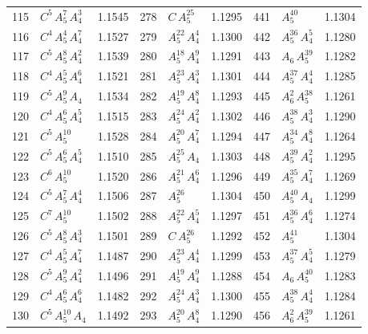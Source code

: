 \begin{longtable}{@{}rlr@{\quad}rlr@{\quad}rlr@{}}
115 & $C^{5}$\,$A_{5}^{7}$\,$A_{4}^{3}$ & 1.1545 & 278 & $C$\,$A_{5}^{25}$ & 1.1295 & 441 & $A_{5}^{40}$ & 1.1304 \\
116 & $C^{4}$\,$A_{5}^{4}$\,$A_{4}^{7}$ & 1.1527 & 279 & $A_{5}^{22}$\,$A_{4}^{4}$ & 1.1300 & 442 & $A_{5}^{36}$\,$A_{4}^{5}$ & 1.1280 \\
117 & $C^{5}$\,$A_{5}^{8}$\,$A_{4}^{2}$ & 1.1539 & 280 & $A_{5}^{18}$\,$A_{4}^{9}$ & 1.1291 & 443 & $A_{6}$\,$A_{5}^{39}$ & 1.1282 \\
118 & $C^{4}$\,$A_{5}^{5}$\,$A_{4}^{6}$ & 1.1521 & 281 & $A_{5}^{23}$\,$A_{4}^{3}$ & 1.1301 & 444 & $A_{5}^{37}$\,$A_{4}^{4}$ & 1.1285 \\
119 & $C^{5}$\,$A_{5}^{9}$\,$A_{4}$ & 1.1534 & 282 & $A_{5}^{19}$\,$A_{4}^{8}$ & 1.1293 & 445 & $A_{6}^{2}$\,$A_{5}^{38}$ & 1.1261 \\
120 & $C^{4}$\,$A_{5}^{6}$\,$A_{4}^{5}$ & 1.1515 & 283 & $A_{5}^{24}$\,$A_{4}^{2}$ & 1.1302 & 446 & $A_{5}^{38}$\,$A_{4}^{3}$ & 1.1290 \\
121 & $C^{5}$\,$A_{5}^{10}$ & 1.1528 & 284 & $A_{5}^{20}$\,$A_{4}^{7}$ & 1.1294 & 447 & $A_{5}^{34}$\,$A_{4}^{8}$ & 1.1264 \\
122 & $C^{5}$\,$A_{5}^{6}$\,$A_{4}^{5}$ & 1.1510 & 285 & $A_{5}^{25}$\,$A_{4}$ & 1.1303 & 448 & $A_{5}^{39}$\,$A_{4}^{2}$ & 1.1295 \\
123 & $C^{6}$\,$A_{5}^{10}$ & 1.1520 & 286 & $A_{5}^{21}$\,$A_{4}^{6}$ & 1.1296 & 449 & $A_{5}^{35}$\,$A_{4}^{7}$ & 1.1269 \\
124 & $C^{5}$\,$A_{5}^{7}$\,$A_{4}^{4}$ & 1.1506 & 287 & $A_{5}^{26}$ & 1.1304 & 450 & $A_{5}^{40}$\,$A_{4}$ & 1.1299 \\
125 & $C^{7}$\,$A_{5}^{10}$ & 1.1502 & 288 & $A_{5}^{22}$\,$A_{4}^{5}$ & 1.1297 & 451 & $A_{5}^{36}$\,$A_{4}^{6}$ & 1.1274 \\
126 & $C^{5}$\,$A_{5}^{8}$\,$A_{4}^{3}$ & 1.1501 & 289 & $C$\,$A_{5}^{26}$ & 1.1292 & 452 & $A_{5}^{41}$ & 1.1304 \\
127 & $C^{4}$\,$A_{5}^{5}$\,$A_{4}^{7}$ & 1.1487 & 290 & $A_{5}^{23}$\,$A_{4}^{4}$ & 1.1299 & 453 & $A_{5}^{37}$\,$A_{4}^{5}$ & 1.1279 \\
128 & $C^{5}$\,$A_{5}^{9}$\,$A_{4}^{2}$ & 1.1496 & 291 & $A_{5}^{19}$\,$A_{4}^{9}$ & 1.1288 & 454 & $A_{6}$\,$A_{5}^{40}$ & 1.1283 \\
129 & $C^{4}$\,$A_{5}^{6}$\,$A_{4}^{6}$ & 1.1482 & 292 & $A_{5}^{24}$\,$A_{4}^{3}$ & 1.1300 & 455 & $A_{5}^{38}$\,$A_{4}^{4}$ & 1.1284 \\
130 & $C^{5}$\,$A_{5}^{10}$\,$A_{4}$ & 1.1492 & 293 & $A_{5}^{20}$\,$A_{4}^{8}$ & 1.1290 & 456 & $A_{6}^{2}$\,$A_{5}^{39}$ & 1.1261 \\

\end{longtable}
